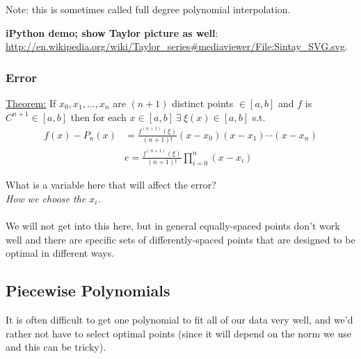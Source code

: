 \documentclass[12pt, answers]{exam}
\begin{document}
Note: this is sometimes called full degree polynomial interpolation.

\textbf{iPython demo; show Taylor picture as well}:\\ \href{http://en.wikipedia.org/wiki/Taylor_series#mediaviewer/File:Sintay_SVG.svg}{http://en.wikipedia.org/wiki/Taylor\_series\#mediaviewer/File:Sintay\_SVG.svg}.

\clearpage
\subsubsection*{Error}
\underline{Theorem:} If $x_0, x_1,\dots, x_n$ are $(n+1)$ distinct points $\in [a,b]$ and $f$ is $C^{n+1} \in [a,b]$ then for each $x\in [a,b] \: \exists \: \xi(x) \in [a,b]$ s.t.
\begin{align}
f(x) - P_n(x)& = \frac{f^{(n+1)}(\xi)}{(n+1)!}(x-x_0)(x-x_1)\cdots(x-x_n)\nonumber \\
&\boxed{e = \frac{f^{(n+1)}(\xi)}{(n+1)!}\prod_{i=0}^n (x-x_i)}\nonumber
\end{align}
%
%

What is a variable here that will affect the error? \\ 
\ifprintanswers
\textit{How we choose the $x_i$.} \\
\else
\vspace*{1em}\\
\fi
We will not get into this here, but in general equally-spaced points don't work well and there are specific sets of differently-spaced points that are designed to be optimal in different ways. 

\subsection*{Piecewise Polynomials}

It is often difficult to get one polynomial to fit all of our data very well, and we'd rather not have to select optimal points (since it will depend on the norm we use and this can be tricky). 
\end{document}
